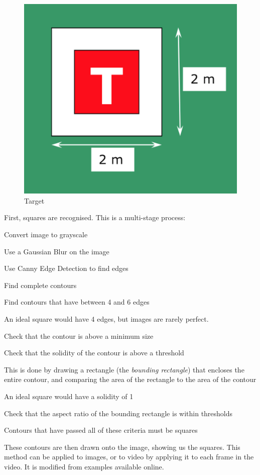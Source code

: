 \documentclass[11pt]{article}
\begin{document}
\begin{figure}
    \begin{center}
        \includegraphics[width=0.48\linewidth]{IMechE_target}
        \caption{Target}
        \label{fig:target}
    \end{center}
\end{figure}

First, squares are recognised. This is a multi-stage process:
\begin{compactenum}
    \item Convert image to grayscale
    \item Use a Gaussian Blur on the image
    \item Use Canny Edge Detection to find edges
    \item Find complete contours
    \item Find contours that have between 4 and 6 edges
    \begin{compactitem}
        \item An ideal square would have 4 edges, but images are rarely perfect.
    \end{compactitem}
    \item Check that the contour is above a minimum size
    \item Check that the solidity of the contour is above a threshold
    \begin{compactitem}
        \item This is done by drawing a rectangle (the \emph{bounding rectangle}) that encloses the entire contour, and comparing the area of the rectangle to the area of the contour
        \item An ideal square would have a solidity of 1
    \end{compactitem}
    \item Check that the aspect ratio of the bounding rectangle is within thresholds
    \item Contours that have passed all of these criteria must be squares
\end{compactenum}
These contours are then drawn onto the image, showing us the squares. This method can be applied to images, or to video by applying it to each frame in the video. It is modified from examples available online.\cite{opencv_tutorials}\cite{pyimagesearch_squares}
\end{document}
